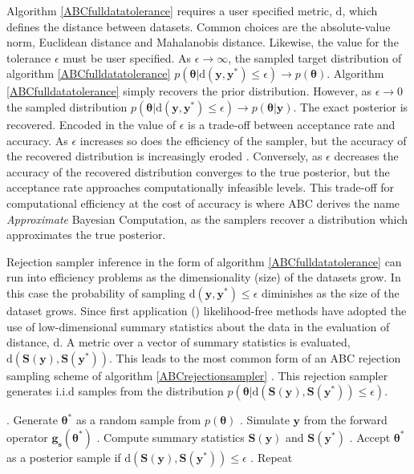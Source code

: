 Algorithm \ref{ABCfulldatatolerance} requires a user specified metric, $\text{d}$, which defines the distance between datasets. Common choices are the absolute-value norm, Euclidean distance and Mahalanobis distance. Likewise, the value for the tolerance $\epsilon$ must be user specified. As $\epsilon \rightarrow \infty$, the sampled target distribution of algorithm \ref{ABCfulldatatolerance} $p(\bm{\theta}|\text{d}(\bm{y},\bm{y^*})\leq\epsilon) \rightarrow p(\bm{\theta})$.  Algorithm \ref{ABCfulldatatolerance} simply recovers the prior distribution. However, as $\epsilon \rightarrow 0$ the sampled distribution $p(\bm{\theta}|\text{d}(\bm{y},\bm{y^*})\leq\epsilon) \rightarrow p(\bm{\theta}|\bm{y})$. The exact posterior is recovered. Encoded in the value of $\epsilon$ is a trade-off between acceptance rate and accuracy. As $\epsilon$ increases so does the efficiency of the sampler, but the accuracy of the recovered distribution is increasingly eroded \citep{Sisson2010a}. Conversely, as $\epsilon$ decreases the accuracy of the recovered distribution converges to the true posterior, but the acceptance rate approaches computationally infeasible levels. This trade-off for computational efficiency at the cost of accuracy is where ABC derives the name \textit{Approximate} Bayesian Computation, as the samplers recover a distribution which approximates the true posterior.\par

Rejection sampler inference in the form of algorithm \ref{ABCfulldatatolerance} can run into efficiency problems as the dimensionality (size) of the datasets grow. In this case the probability of sampling $\text{d}(\bm{y},\bm{y^*})\leq\epsilon$ diminishes as the size of the dataset grows. Since first application (\citep{Tavare1997}) likelihood-free methods have adopted the use of low-dimensional summary statistics about the data in the evaluation of distance, $\text{d}$. A metric over a vector of summary statistics is evaluated, $\text{d}(\bm{S}(\bm{y}),\bm{S}(\bm{y^*}))$. This leads to the most common form of an ABC rejection sampling scheme of algorithm \ref{ABCrejectionsampler} \citep{Pritchard1999a}. This rejection sampler generates i.i.d samples from the distribution $p(\bm{\theta}|\text{d}(\bm{S}(\bm{y}),\bm{S}(\bm{y^*}))\leq\epsilon)$.

\begin{algorithm}[H]
	\caption{ }
	\begin{algorithmic}
		. Generate $\bm{\theta^*}$ as a random sample from $p(\bm{\theta})$		
		. Simulate $\bm{y}$ from the forward operator $\bm{g_s}(\bm{\theta^*})$		
		. Compute summary statistics $\bm{S}(\bm{y})$ and $\bm{S}(\bm{y^*})$		
		. Accept $\bm{\theta^*}$ as a posterior sample if $\text{d}(\bm{S}(\bm{y}),\bm{S}(\bm{y^*}))\leq\epsilon$		
		. Repeat
	\end{algorithmic}
	\label{ABCrejectionsampler}
\end{algorithm}

